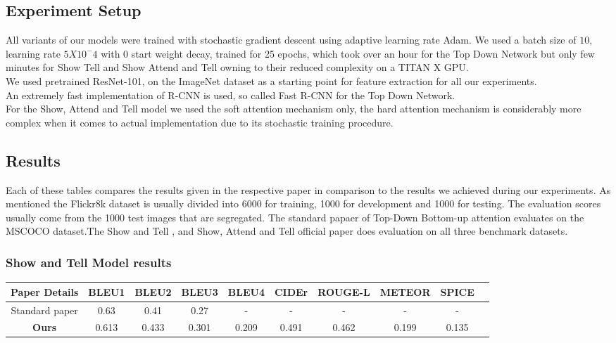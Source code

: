 \documentclass[a4paper]{article}
\begin{document}
\subsection{Experiment Setup}

All variants of our models were trained with stochastic gradient descent using adaptive learning rate Adam\cite{kingma2014adam}. We used a batch size of $10$, learning rate $5 X 10^-4$ with 0 start weight decay, trained for 25 epochs, which took over an hour for the Top Down Network but only few minutes for Show Tell and Show Attend and Tell owning to their reduced complexity on a TITAN X GPU.\\
\noindent We used pretrained ResNet-101, on the ImageNet dataset as a starting point for feature extraction for all our experiments.\\
\noindent An extremely fast implementation of R-CNN is used, so called Fast R-CNN\cite{ren2015faster} for the Top Down Network.\\
\noindent For the Show, Attend and Tell model we used the soft attention mechanism only, the hard attention mechanism is considerably more complex when it comes to actual implementation due to its stochastic training procedure.

\subsection{Results}

Each of these tables compares the results given in the respective paper in comparison to the results we achieved during our experiments. As mentioned the Flickr8k dataset is usually divided into 6000 for training, 1000 for development and 1000 for testing. The evaluation scores usually come from the 1000 test images that are segregated. 
The standard papaer of Top-Down Bottom-up attention evaluates on the MSCOCO dataset.The Show and Tell , and Show, Attend and Tell official paper does evaluation on all three benchmark datasets. 
\subsubsection{Show and Tell Model results}
\begin{center}
 \begin{tabular}{|c| c| c| c| c| c| c | c| c| c|} 
 \hline
 
 Paper Details & BLEU1 & BLEU2 & BLEU3 & BLEU4 & CIDEr & ROUGE-L & METEOR & SPICE\\ [0.2ex] 
 \hline
  Standard paper & 0.63 & 0.41 & 0.27 & - & - & - & - & - & \\ 
 \hline
\textbf{Ours} & 0.613& 0.433& 0.301& 0.209 & 0.491 &0.462&0.199&0.135&  \\
 \hline

\hline
\end{tabular}
\end{center}
\end{document}
